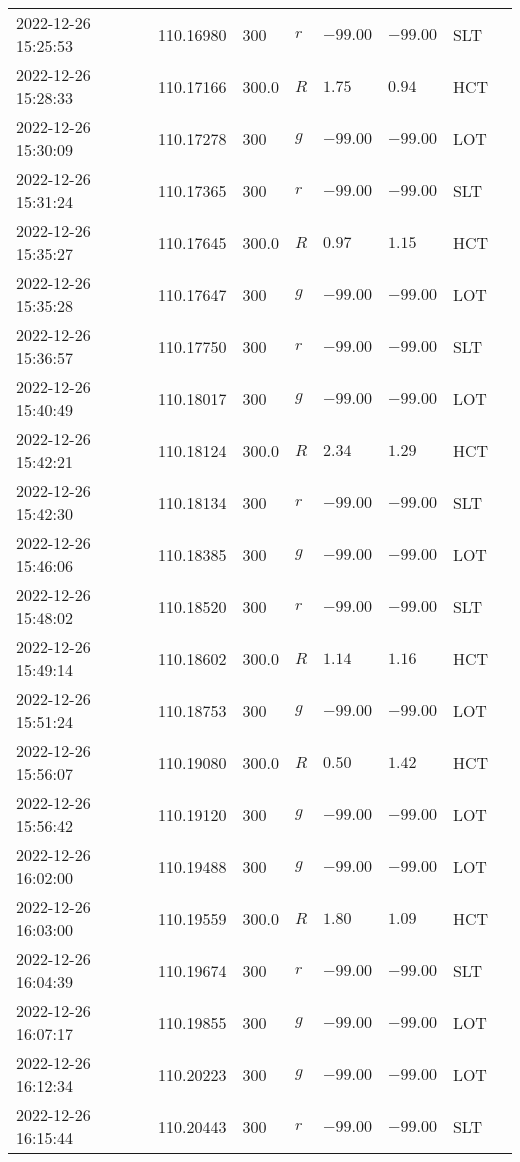 \documentclass{nature_plusfigure}
\begin{document}
\begin{supplement}
\begin{center}
\begin{longtable}{llllllll}
2022-12-26 15:25:53 & 110.16980 & 300 & $r$ & $-99.00$ & $-99.00$ & SLT &  \\ 
2022-12-26 15:28:33 & 110.17166 & 300.0 & $R$ & $1.75$ & $0.94$ & HCT &  \\ 
2022-12-26 15:30:09 & 110.17278 & 300 & $g$ & $-99.00$ & $-99.00$ & LOT &  \\ 
2022-12-26 15:31:24 & 110.17365 & 300 & $r$ & $-99.00$ & $-99.00$ & SLT &  \\ 
2022-12-26 15:35:27 & 110.17645 & 300.0 & $R$ & $0.97$ & $1.15$ & HCT &  \\ 
2022-12-26 15:35:28 & 110.17647 & 300 & $g$ & $-99.00$ & $-99.00$ & LOT &  \\ 
2022-12-26 15:36:57 & 110.17750 & 300 & $r$ & $-99.00$ & $-99.00$ & SLT &  \\ 
2022-12-26 15:40:49 & 110.18017 & 300 & $g$ & $-99.00$ & $-99.00$ & LOT &  \\ 
2022-12-26 15:42:21 & 110.18124 & 300.0 & $R$ & $2.34$ & $1.29$ & HCT &  \\ 
2022-12-26 15:42:30 & 110.18134 & 300 & $r$ & $-99.00$ & $-99.00$ & SLT &  \\ 
2022-12-26 15:46:06 & 110.18385 & 300 & $g$ & $-99.00$ & $-99.00$ & LOT &  \\ 
2022-12-26 15:48:02 & 110.18520 & 300 & $r$ & $-99.00$ & $-99.00$ & SLT &  \\ 
2022-12-26 15:49:14 & 110.18602 & 300.0 & $R$ & $1.14$ & $1.16$ & HCT &  \\ 
2022-12-26 15:51:24 & 110.18753 & 300 & $g$ & $-99.00$ & $-99.00$ & LOT &  \\ 
2022-12-26 15:56:07 & 110.19080 & 300.0 & $R$ & $0.50$ & $1.42$ & HCT &  \\ 
2022-12-26 15:56:42 & 110.19120 & 300 & $g$ & $-99.00$ & $-99.00$ & LOT &  \\ 
2022-12-26 16:02:00 & 110.19488 & 300 & $g$ & $-99.00$ & $-99.00$ & LOT &  \\ 
2022-12-26 16:03:00 & 110.19559 & 300.0 & $R$ & $1.80$ & $1.09$ & HCT &  \\ 
2022-12-26 16:04:39 & 110.19674 & 300 & $r$ & $-99.00$ & $-99.00$ & SLT &  \\ 
2022-12-26 16:07:17 & 110.19855 & 300 & $g$ & $-99.00$ & $-99.00$ & LOT &  \\ 
2022-12-26 16:12:34 & 110.20223 & 300 & $g$ & $-99.00$ & $-99.00$ & LOT &  \\ 
2022-12-26 16:15:44 & 110.20443 & 300 & $r$ & $-99.00$ & $-99.00$ & SLT &  \\ 

\end{longtable}
\end{center}
\end{supplement}
\end{document}
